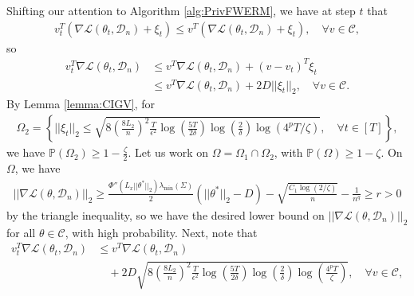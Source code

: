 \documentclass{article}
\begin{document}
Shifting our attention to Algorithm \ref{alg:PrivFWERM}, we have at step $t$ that 
\begin{align*}
v_t^T(\nabla \mathcal{L}(\theta_t, \mathcal{D}_n) + \xi_t) \leq v^T(\nabla \mathcal{L}(\theta_t, \mathcal{D}_n) + \xi_t), \quad \forall v \in \mathcal{C},
\end{align*}
so 
\begin{align*}
v_t^T\nabla \mathcal{L}(\theta_t, \mathcal{D}_n) &\leq v^T\nabla \mathcal{L}(\theta_t, \mathcal{D}_n) + (v - v_t)^T\xi_t\\
&\leq v^T\nabla \mathcal{L}(\theta_t, \mathcal{D}_n) + 2D||\xi_t||_2, \quad \forall v \in \mathcal{C}.
\end{align*}
By Lemma \ref{lemma:CIGV}, for
\begin{align*}
\Omega_2 = \left\{||\xi_t||_2 \leq \sqrt{8\left(\frac{8L_2}{n}\right)^2\frac{T}{\epsilon^2} \log\left(\frac{5T}{2\delta}\right)\log\left(\frac{2}{\delta}\right)\log(4^pT/\zeta)},  \quad \forall t \in [T] \right\},
\end{align*}
we have $\mathbb{P}(\Omega_2) \geq 1 - \frac{\zeta}{2}$. Let us work on $\Omega = \Omega_1 \cap \Omega_2$, with $\mathbb{P}(\Omega) \geq 1 - \zeta$. On $\Omega$, we have
\begin{align*}
||\nabla \mathcal{L}(\theta, \mathcal{D}_n)||_2 \geq \frac{\Phi''(L_x||\theta^*||_2)\lambda_{\min}(\Sigma)}{2}(||\theta^*||_2 - D) - \sqrt{\frac{C_1\log(2/\zeta)}{n}} - \frac{1}{n^q} \geq r > 0
\end{align*}
by the triangle inequality, so we have the desired lower bound on $||\nabla \mathcal{L}(\theta, \mathcal{D}_n)||_2$ for all $\theta \in \mathcal{C}$, with high probability. Next, note that 
\begin{align*}
v_t^T\nabla \mathcal{L}(\theta_t, \mathcal{D}_n) &\leq v^T\nabla \mathcal{L}(\theta_t, \mathcal{D}_n)\\
& \quad + 2D\sqrt{8\left(\frac{8L_2}{n}\right)^2\frac{T}{\epsilon^2} \log\left(\frac{5T}{2\delta}\right)\log\left(\frac{2}{\delta}\right)\log\left(\frac{4^pT}{\zeta}\right)}, \quad \forall v \in \mathcal{C},
\end{align*}
\end{document}
